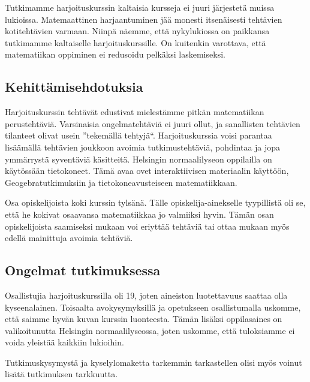 Tutkimamme harjoituskurssin kaltaisia kursseja ei juuri järjestetä muissa lukioissa.
Matemaattinen harjaantuminen jää monesti itsenäisesti tehtävien kotitehtävien varmaan.
Niinpä näemme, että nykylukiossa on paikkansa tutkimamme kaltaiselle harjoituskurssille.%
On kuitenkin varottava, että matematiikan oppiminen ei redusoidu pelkäksi laskemiseksi.

\subsection{Kehittämisehdotuksia}
Harjoituskurssin tehtävät edustivat mielestämme pitkän matematiikan perustehtäviä.
Varsinaisia ongelmatehtäviä ei juuri ollut, ja sanallisten tehtävien tilanteet olivat usein ''tekemällä tehtyjä``.
Harjoituskurssia voisi parantaa lisäämällä tehtävien joukkoon avoimia tutkimustehtäviä, pohdintaa ja jopa ymmärrystä syventäviä käsitteitä.
Helsingin normaalilyseon oppilailla on käytössään tietokoneet.
Tämä avaa ovet interaktiivisen materiaalin käyttöön, Geogebratutkimuksiin ja tietokoneavusteiseen matematiikkaan.

Osa opiskelijoista koki kurssin tylsänä.
Tälle opiskelija-ainekselle tyypillistä oli se, että he kokivat osaavansa matematiikkaa jo valmiiksi hyvin.
Tämän osan opiskelijoista saamiseksi mukaan voi eriyttää tehtäviä tai ottaa mukaan myös edellä mainittuja avoimia tehtäviä.

\subsection{Ongelmat tutkimuksessa}
Osallistujia harjoituskurssilla oli 19, joten aineiston luotettavuus saattaa olla kyseenalainen.
Toisaalta avokysymyksillä ja opetukseen osallistumalla uskomme, että saimme hyvän kuvan kurssin luonteesta.
Tämän lisäksi oppilasaines on valikoitunutta Helsingin normaalilyseossa, joten uskomme, että tuloksiamme ei voida yleistää kaikkiin lukioihin.

Tutkimuskysymystä ja kyselylomaketta tarkemmin tarkastellen olisi myös voinut lisätä tutkimuksen tarkkuutta.

